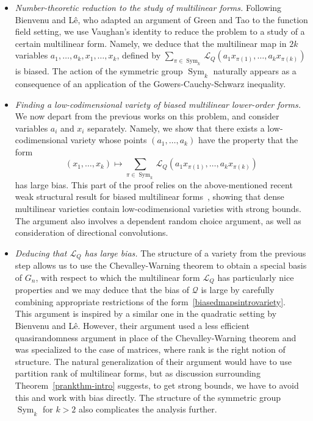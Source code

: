 \documentclass[a4paper,11pt]{article}
\theoremstyle{definition}
\newcommand{\on}[1]{
	\operatorname{#1}
}
\begin{document}
\begin{itemize}
    \item[\textbf{Step 1.}] \textit{Number-theoretic reduction to the study of multilinear forms.} Following Bienvenu and L\^{e}, who adapted an argument of Green and Tao to the function field setting, we use Vaughan's identity to reduce the problem to a study of a certain multilinear form. Namely, we deduce that the multilinear map in $2k$ variables $a_1, \dots, a_k, x_1, \dots, x_k$, defined by $\sum_{\pi \in \on{Sym}_k}\mathcal{L}_Q(a_1 x_{\pi(1)}, \dots, a_k x_{\pi(k)})$ is biased. The action of the symmetric group $\on{Sym}_k$ naturally appears as a consequence of an application of the Gowers-Cauchy-Schwarz inequality.
    \item[\textbf{Step 2.}] \textit{Finding a low-codimensional variety of biased multilinear lower-order forms.} We now depart from the previous works on this problem, and consider variables $a_i$ and $x_i$ separately. Namely, we show that there exists a low-codimensional variety whose points $(a_1, \dots, a_k)$ have the property that the form
    \begin{equation}\label{biasedmapsintrovariety}
        (x_1, \dots, x_k) \mapsto \sum_{\pi \in \on{Sym}_k}\mathcal{L}_Q(a_1 x_{\pi(1)}, \dots, a_k x_{\pi(k)})
    \end{equation}
    has large bias. This part of the proof relies on the above-mentioned recent weak structural result for biased multilinear forms~\cite{LukaOptimalWeak}, showing that dense multilinear varieties contain low-codimensional varieties with strong bounds. The argument also involves a dependent random choice argument, as well as consideration of directional convolutions.
    \item[\textbf{Step 3.}] \textit{Deducing that $\mathcal{L}_Q$ has large bias.} The structure of a variety from the previous step allows us to use the Chevalley-Warning theorem to obtain a special basis of $G_n$, with respect to which the multilinear form $\mathcal{L}_Q$ has particularly nice properties and we may deduce that the bias of $\mathcal{Q}$ is large by carefully combining appropriate restrictions of the form~\eqref{biasedmapsintrovariety}.\\
    \phantom{\,}\hspace{6pt} This argument is inspired by a similar one in the quadratic setting by Bienvenu and L\^{e}. However, their argument used a less efficient quasirandomness argument in place of the Chevalley-Warning theorem and was specialized to the case of matrices, where rank is the right notion of structure. The natural generalization of their argument would have to use partition rank of multilinear forms, but as discussion surrounding Theorem~\ref{prankthm-intro} suggests, to get strong bounds, we have to avoid this and work with bias directly. The structure of the symmetric group $\on{Sym}_k$ for $k > 2$ also complicates the analysis further.

\end{itemize}
\end{document}
